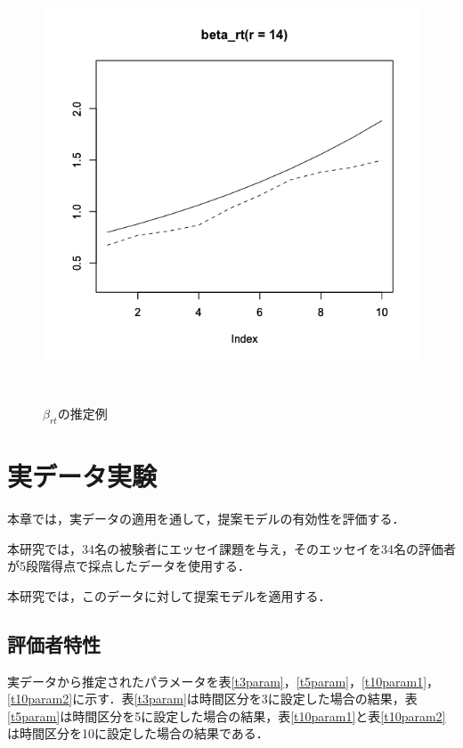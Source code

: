 \documentclass[a4paper,11pt,oneside,openany]{jsbook}
\begin{document}
\begin{figure}[]
\begin{minipage}[b]{0.3\linewidth}
  \label{2}
 \end{minipage}
 \begin{minipage}[b]{0.3\linewidth}
  \centering
  \includegraphics[keepaspectratio,scale=0.25]{img/beta_rt_3.png}
  \label{3}
 \end{minipage}\\
 \caption{$\beta_{rt}$の推定例}\label{beta_rt_recovery}
\end{figure}

\newpage
\chapter{実データ実験}
本章では，実データの適用を通して，提案モデルの有効性を評価する．

本研究では，34名の被験者にエッセイ課題を与え，そのエッセイを34名の評価者が5段階得点で採点したデータを使用する．

本研究では，このデータに対して提案モデルを適用する．
\section{評価者特性}
実データから推定されたパラメータを表\ref{t3param}，\ref{t5param}，\ref{t10param1}，\ref{t10param2}に示す．表\ref{t3param}は時間区分を3に設定した場合の結果，表\ref{t5param}は時間区分を5に設定した場合の結果，表\ref{t10param1}と表\ref{t10param2}は時間区分を10に設定した場合の結果である．
\end{document}
